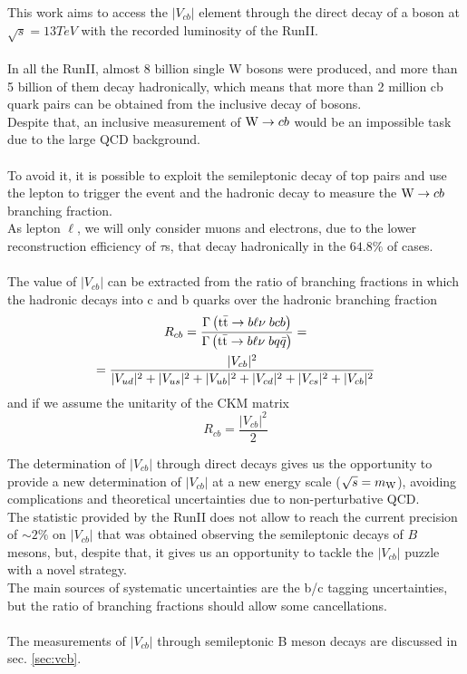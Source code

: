 \label{sec:Events}
\minitoc
\vspace{0.5cm}
This work aims to access the $|V_{cb}|$ element through the direct decay of a \PW boson at $\sqrt{s}=13 TeV$ with the recorded luminosity of the RunII.\\
\\
In all the RunII, almost 8 billion single W bosons were produced, and more than 5 billion of them decay hadronically, which means that more than 2 million cb quark pairs can be obtained from the inclusive decay of \PW bosons. \\
Despite that, an inclusive measurement of ${\text{W}} \to cb$ would be an impossible task due to the large QCD background.\\
\\
To avoid it, it is possible to exploit the semileptonic decay of top pairs and use the lepton to trigger the event and the hadronic \PW decay to measure the ${\text{W}} \to cb$ branching fraction.\\
As lepton $\ell$, we will only consider muons and electrons, due to the lower reconstruction efficiency of $\tau$s, that decay hadronically in the $64.8\%$ of cases.
\\
\\
The value of $|V_{cb}|$ can be extracted from the ratio of branching fractions in which the hadronic \PW decays into c and b quarks over the  \PW hadronic branching fraction
\begin{equation}
\begin{gathered}
    R_{cb}=\frac{\Gamma\left({{\text{t}}{\bar{\text{t}}}} \to b\ell \nu\; b cb\right)}{\Gamma\left({{\text{t}}{\bar{\text{t}}}} \to b\ell \nu\; b q\bar{q}\right)}=\\ =\frac{|V_{cb}|^2}{|V_{ud}|^2+|V_{us}|^2+|V_{ub}|^2+|V_{cd}|^2+|V_{cs}|^2+|V_{cb}|^2}
\end{gathered}
\end{equation}
and if we assume the unitarity of the CKM matrix
\begin{equation}
    R_{cb}=\frac{|V_{cb}|^2}{2}
\end{equation}

The determination of $|V_{cb}|$ through direct \PW decays gives us the opportunity to provide a new determination of $|V_{cb}|$ at a new energy scale ($\sqrt{s}=m_{{\text{W}}}$), avoiding complications and theoretical uncertainties due to non-perturbative QCD.\\
The statistic provided by the RunII does not allow to reach the current precision of $\sim2 \%$ on $|V_{cb}|$ that was obtained observing the semileptonic decays of $B$ mesons, but, despite that, it gives us an opportunity to tackle the $|V_{cb}|$ puzzle with a novel strategy.\\
The main sources of systematic uncertainties are the b/c tagging uncertainties, but the ratio of branching fractions should allow some cancellations.\\
\\
The measurements of $|V_{cb}|$ through semileptonic B meson decays are discussed in sec. \ref{sec:vcb}.


